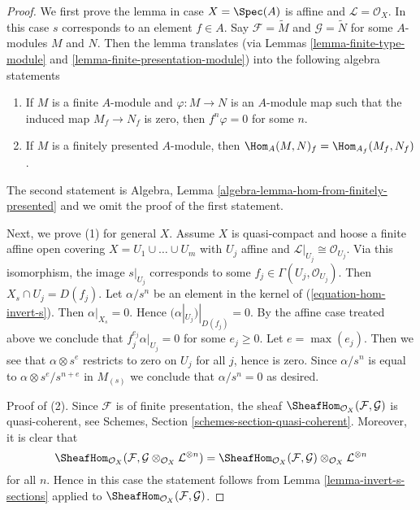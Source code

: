 \begin{proof}
We first prove the lemma in case $X = \Spec(A)$ is affine
and $\mathcal{L} = \mathcal{O}_X$. In this case $s$ corresponds
to an element $f \in A$. Say
$\mathcal{F} = \widetilde{M}$ and $\mathcal{G} = \widetilde{N}$
for some $A$-modules $M$ and $N$. Then the lemma translates
(via Lemmas \ref{lemma-finite-type-module} and
\ref{lemma-finite-presentation-module}) into
the following algebra statements
\begin{enumerate}
\item If $M$ is a finite $A$-module and $\varphi : M \to N$ is
an $A$-module map such that the induced map $M_f \to N_f$ is zero,
then $f^n\varphi = 0$ for some $n$.
\item If $M$ is a finitely presented $A$-module, then
$\Hom_A(M, N)_f = \Hom_{A_f}(M_f, N_f)$.
\end{enumerate}
The second statement is
Algebra, Lemma \ref{algebra-lemma-hom-from-finitely-presented} and we omit
the proof of the first statement.

\medskip\noindent
Next, we prove (1) for general $X$.
Assume $X$ is quasi-compact and hoose a finite affine open covering
$X = U_1 \cup \ldots \cup U_m$ with $U_j$ affine and
$\mathcal{L}|_{U_j} \cong \mathcal{O}_{U_j}$. Via this isomorphism,
the image $s|_{U_j}$ corresponds to some
$f_j \in \Gamma(U_j, \mathcal{O}_{U_j})$. Then
$X_s \cap U_j = D(f_j)$.
Let $\alpha/s^n$ be an element in the kernel of
(\ref{equation-hom-invert-s}). Then $\alpha|_{X_s} = 0$.
Hence $(\alpha|_{U_j})|_{D(f_j)} = 0$. By the affine case treated above
we conclude that $f_j^{e_j} \alpha|_{U_j} = 0$ for some
$e_j \geq 0$. Let $e = \max(e_j)$. Then we see that $\alpha \otimes s^e$
restricts to zero on $U_j$ for all $j$, hence is zero. Since $\alpha/s^n$
is equal to $\alpha \otimes s^e/s^{n + e}$ in $M_{(s)}$ we conclude that
$\alpha/s^n = 0$ as desired.

\medskip\noindent
Proof of (2). Since $\mathcal{F}$ is of finite presentation, the
sheaf $\SheafHom_{\mathcal{O}_X}(\mathcal{F}, \mathcal{G})$ is
quasi-coherent, see Schemes, Section \ref{schemes-section-quasi-coherent}.
Moreover, it is clear that
$$
\SheafHom_{\mathcal{O}_X}(\mathcal{F},
\mathcal{G} \otimes_{\mathcal{O}_X} \mathcal{L}^{\otimes n}) =
\SheafHom_{\mathcal{O}_X}(\mathcal{F}, \mathcal{G})
\otimes_{\mathcal{O}_X} \mathcal{L}^{\otimes n}
$$
for all $n$. Hence in this case the statement follows from
Lemma \ref{lemma-invert-s-sections} applied to
$\SheafHom_{\mathcal{O}_X}(\mathcal{F}, \mathcal{G})$.
\end{proof}





